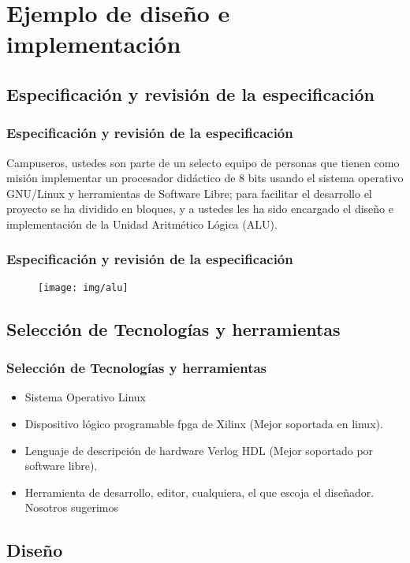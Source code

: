 \documentclass{beamer}
\begin{document}
\section{Ejemplo de diseño e implementación}

\subsection{Especificación y revisión de la especificación}

\begin{frame}
  \frametitle{Especificación y revisión de la especificación}
  Campuseros, ustedes son parte de un selecto equipo de personas que tienen como misión implementar un procesador didáctico de 8 bits usando el sistema operativo GNU/Linux y herramientas de Software Libre; para facilitar el desarrollo el proyecto se ha dividido en bloques, y a ustedes les ha sido encargado el diseño e implementación de la Unidad Aritmético Lógica (ALU).
\end{frame}

\begin{frame}
  \frametitle{Especificación y revisión de la especificación}
  \begin{figure}
    \texttt{[image: img/alu]}
  \end{figure}
\end{frame}

\subsection{Selección de Tecnologías y herramientas}

\begin{frame}
  \frametitle{Selección de Tecnologías y herramientas}
  \begin{itemize}
  \item Sistema Operativo Linux
  \item Dispositivo lógico programable fpga de Xilinx (Mejor soportada en linux).
  \item Lenguaje de descripción de hardware Verlog HDL (Mejor soportado por software libre).
  \item Herramienta de desarrollo, editor, cualquiera, el que escoja el diseñador. Nosotros sugerimos
  \end{itemize}
\end{frame}

\subsection{Diseño}
\end{document}
